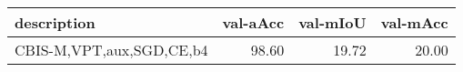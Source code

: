 \begin{tabular}{lrrr}
\toprule
description & val-aAcc & val-mIoU & val-mAcc \\
\midrule
CBIS-M,VPT,aux,SGD,CE,b4 & 98.60 & 19.72 & 20.00 \\
\bottomrule
\end{tabular}
